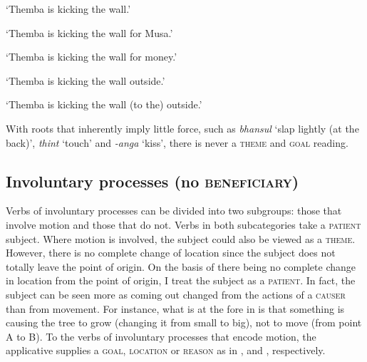 \documentclass[output=paper]{langsci/langscibook}
\begin{document}
\glt ‘Themba is kicking the wall.’


\glt ‘Themba is kicking the wall for Musa.’


\glt ‘Themba is kicking the wall for money.’


\glt ‘Themba is kicking the wall outside.’


\glt ‘Themba is kicking the wall (to the) outside.’
\z
\z

With roots that inherently imply little force, such as \textit{bhansul} ‘slap lightly (at the back)’, \textit{thint} ‘touch’ and \textit{-anga} ‘kiss’, there is never a \textsc{theme} and \textsc{goal} reading.

\subsection{Involuntary processes (no \textsc{beneficiary})}\label{sec:sibanda:4.4}

Verbs of involuntary processes can be divided into two subgroups: those that involve motion and those that do not. Verbs in both subcategories take a \textsc{patient} subject. Where motion is involved, the subject could also be viewed as a \textsc{theme}. However, there is no complete change of location since the subject does not totally leave the point of origin. On the basis of there being no complete change in location from the point of origin, I treat the subject as a \textsc{patient}. In fact, the subject can be seen more as coming out changed from the actions of a \textsc{causer} than from movement. For instance, what is at the fore in  is that something is causing the tree to grow (changing it from small to big), not to move (from point A to B). To the verbs of involuntary processes that encode motion, the applicative supplies a \textsc{goal}, \textsc{location} or \textsc{reason} as in ,  and , respectively.
\end{document}
